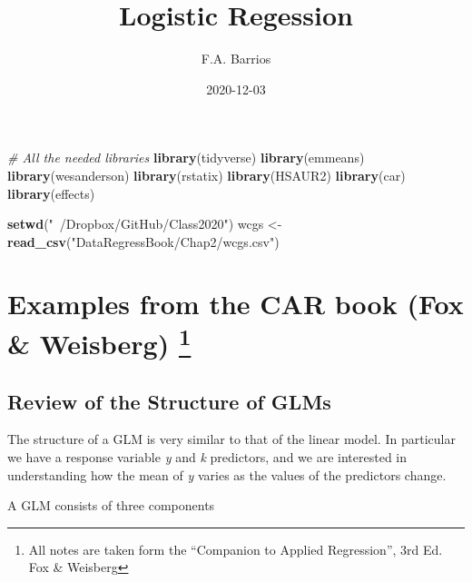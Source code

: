 \documentclass[
]{article}
\title{Logistic Regession}
\author{F.A. Barrios}
\date{2020-12-03}
\newenvironment{Shaded}{\begin{snugshade}}{\end{snugshade}}
\newcommand{\CommentTok}[1]{\textcolor[rgb]{0.56,0.35,0.01}{\textit{#1}}}
\newcommand{\KeywordTok}[1]{\textcolor[rgb]{0.13,0.29,0.53}{\textbf{#1}}}
\newcommand{\NormalTok}[1]{#1}
\newcommand{\StringTok}[1]{\textcolor[rgb]{0.31,0.60,0.02}{#1}}
\begin{document}
\maketitle

\begin{Shaded}
\begin{Highlighting}[]
\CommentTok{# All the needed libraries}
\KeywordTok{library}\NormalTok{(tidyverse)}
\KeywordTok{library}\NormalTok{(emmeans)}
\KeywordTok{library}\NormalTok{(wesanderson)}
\KeywordTok{library}\NormalTok{(rstatix)}
\KeywordTok{library}\NormalTok{(HSAUR2)}
\KeywordTok{library}\NormalTok{(car)}
\KeywordTok{library}\NormalTok{(effects)}

\KeywordTok{setwd}\NormalTok{(}\StringTok{"~/Dropbox/GitHub/Class2020"}\NormalTok{)}
\NormalTok{wcgs <-}\StringTok{ }\KeywordTok{read_csv}\NormalTok{(}\StringTok{"DataRegressBook/Chap2/wcgs.csv"}\NormalTok{)}
\end{Highlighting}
\end{Shaded}

\hypertarget{examples-from-the-car-book-fox-weisberg-1}{%
\section[Examples from the CAR book (Fox \& Weisberg)
]{\texorpdfstring{Examples from the CAR book (Fox \& Weisberg)
\footnote{All notes are taken form the ``Companion to Applied
  Regression'', 3rd Ed. Fox \& Weisberg}}{Examples from the CAR book (Fox \& Weisberg) }}\label{examples-from-the-car-book-fox-weisberg-1}}

\hypertarget{review-of-the-structure-of-glms}{%
\subsection{Review of the Structure of
GLMs}\label{review-of-the-structure-of-glms}}

The structure of a GLM is very similar to that of the linear model. In
particular we have a response variable \emph{y} and \emph{k} predictors,
and we are interested in understanding how the mean of \emph{y} varies
as the values of the predictors change.

A GLM consists of three components
\end{document}
